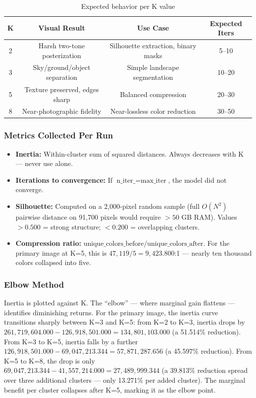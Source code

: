 \begin{table}[H]
\centering{}
\begin{tabular}{c c c c}
\toprule\rowcolor{tablehead!80}\color{white}\textbf{K} &\color{white}\textbf{Visual Result} &\color{white}\textbf{Use Case} &\color{white}\textbf{Expected Iters}\\
\midrule
2 & Harsh two-tone posterization & Silhouette extraction, binary masks & 5--10\\
3 & Sky/ground/object separation & Simple landscape segmentation & 10--20\\
5 & Texture preserved, edges sharp & Balanced compression & 20--30\\
8 & Near-photographic fidelity & Near-lossless color reduction & 30--50\\
\bottomrule
\end{tabular}
\caption{Expected behavior per K value}
\end{table}

\subsubsection{Metrics Collected Per Run}
\begin{itemize}
  \item \textbf{Inertia:} Within-cluster sum of squared distances. Always decreases with K — never use alone.
  \item \textbf{Iterations to convergence:} If $\text{n\_iter\_} = \text{max\_iter}$, the model did not converge.
  \item \textbf{Silhouette:} Computed on a 2{,}000-pixel random sample (full $O(N^2)$ pairwise distance on 91{,}700 pixels would require $>50$ GB RAM). Values $>0.500$ = strong structure; $<0.200$ = overlapping clusters.
  \item \textbf{Compression ratio:} $\text{unique\_colors\_before} / \text{unique\_colors\_after}$. For the primary image at K=5, this is $47{,}119 / 5 = 9{,}423.800$:1 — nearly ten thousand colors collapsed into five.
\end{itemize}

\subsubsection{Elbow Method}
Inertia is plotted against K. The ``elbow'' — where marginal gain flattens — identifies diminishing returns. For the primary image, the inertia curve transitions sharply between K=3 and K=5: from K=2 to K=3, inertia drops by $261{,}719{,}604.000 - 126{,}918{,}501.000 = 134{,}801{,}103.000$ (a 51.514\% reduction). From K=3 to K=5, inertia falls by a further $126{,}918{,}501.000 - 69{,}047{,}213.344 = 57{,}871{,}287.656$ (a 45.597\% reduction). From K=5 to K=8, the drop is only $69{,}047{,}213.344 - 41{,}557{,}214.000 = 27{,}489{,}999.344$ (a 39.813\% reduction spread over three additional clusters — only 13.271\% per added cluster). The marginal benefit per cluster collapses after K=5, marking it as the elbow point.

